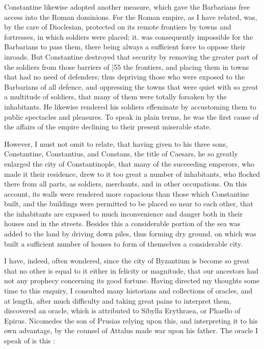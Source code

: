 Constantine likewise adopted another measure, which gave the Barbarians free access into the Roman dominions. For the Roman empire, as I have related, was, by the care of Dioclesian, protected on its remote frontiers by towns and fortresses, in which soldiers were placed; it. was consequently impossible for the Barbarians to pass them, there being always a sufficient force to oppose their inroads. But Constantine destroyed that security by removing the greater part of the soldiers from those barriers of
|55 the frontiers, and placing them in towns that had no need of defenders; thus depriving those who were exposed to the Barbarians of all defence, and oppressing the towns that were quiet with so great a multitude of soldiers, that many of them were totally forsaken by the inhabitants. He likewise rendered his soldiers effeminate by accustoming them to public spectacles and pleasures. To speak in plain terms, he was the first cause of the affairs of the empire declining to their present miserable state.

However, I must not omit to relate, that having given to his three sons, Constantine, Constantius, and Constans, the title of Caesars, he so greatly enlarged the city of Constantinople, that many of the succeeding emperors, who made it their residence, drew to it too great a number of inhabitants, who flocked there from all parts, as soldiers, merchants, and in other occupations. On this account, its walls were rendered more capacious than those which Constantine built, and the buildings were permitted to be placed so near to each other, that the inhabitants are exposed to much inconvenience and danger both in their houses and in the streets. Besides this a considerable portion of the sea was added to the land by driving down piles, thus forming dry ground, on which was built a sufficient number of houses to form of themselves a considerable city.

I have, indeed, often wondered, since the city of Byzantium is become so great that no other is equal to it either in felicity or magnitude, that our ancestors had not any prophecy concerning its good fortune. Having directed my thoughts some time to this enquiry, I consulted many historians and collections of oracles, and at length, after much difficulty and taking great pains to interpret them, discovered an oracle, which is attributed to Sibylla Erythraea, or Phaello of Epirus. Nicomedes the son of Prusias relying upon this, and interpreting it to his own advantage, by the counsel of Attalus made war upon his father. The oracle I speak of is this :

